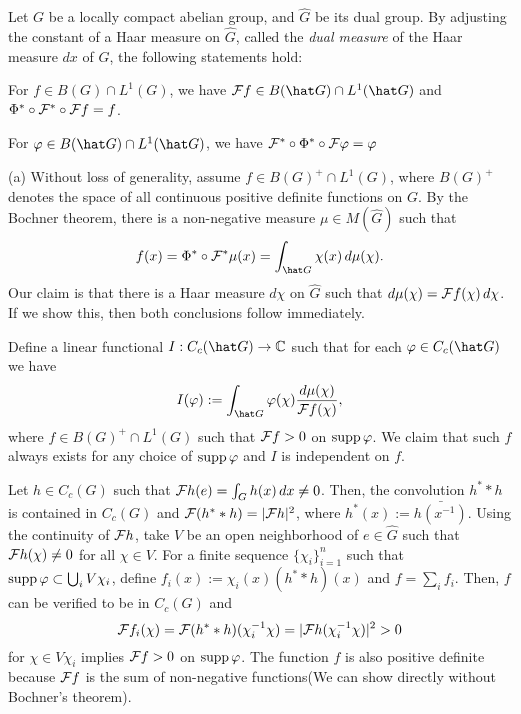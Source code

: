 \documentclass[a4paper]{article}
\begin{document}
\begin{thm}
Let $G$ be a locally compact abelian group, and $\hat G$ be its dual group.
By adjusting the constant of a Haar measure on $\hat G$, called the \emph{dual measure} of the Haar measure $dx$ of $G$, the following statements hold:
\begin{parts}
\item For $f\in B(G)\cap L^1(G)$, we have $\cF f\in B(\hat G)\cap L^1(\hat G)$ and $\Phi^*\circ\mathcal{F}^*\circ\mathcal{F} f=f$.
\item For $\f\in B(\hat G)\cap L^1(\hat G)$, we have $\mathcal{F}^*\circ\Phi^*\circ\mathcal{F}\varphi=\varphi$
\end{parts}
\end{thm}
\begin{pf}
(a)
Without loss of generality, assume $f\in B(G)^+\cap L^1(G)$, where $B(G)^+$ denotes the space of all continuous positive definite functions on $G$.
By the Bochner theorem, there is a non-negative measure $\mu\in M(\hat G)$ such that
\[f(x)=\Phi^*\circ\cF^*\mu(x)=\int_{\hat G}\chi(x)\,d\mu(\chi).\]
Our claim is that there is a Haar measure $d\chi$ on $\hat G$ such that $d\mu(\chi)=\mathcal{F} f(\chi)\,d\chi$.
If we show this, then both conclusions follow immediately.

Define a linear functional $I:C_c(\hat G)\to\C$ such that for each $\f\in C_c(\hat G)$ we have
\[I(\f):=\int_{\hat G}\f(\chi)\frac{d\mu(\chi)}{\cF f(\chi)},\]
where $f\in B(G)^+\cap L^1(G)$ such that $\mathcal{F} f>0$ on $\operatorname{supp}\varphi$.
We claim that such $f$ always exists for any choice of $\operatorname{supp}\varphi$ and $I$ is independent on $f$.

Let $h\in C_c(G)$ such that $\mathcal{F} h(e)=\int_Gh(x)\,dx\ne0$.
Then, the convolution $h^**h$ is contained in $C_c(G)$ and $\mathcal{F}(h^**h)=|\mathcal{F} h|^2$, where $h^*(x):=\bar{h(x^{-1})}$.
Using the continuity of $\mathcal{F} h$, take $V$ be an open neighborhood of $e\in\hat G$ such that $\mathcal{F} h(\chi)\ne0$ for all $\chi\in V$.
For a finite sequence $\{\chi_i\}_{i=1}^n$ such that $\operatorname{supp}\varphi\subset\bigcup_iV\chi_i$, define $f_i(x):=\chi_i(x)(h^**h)(x)$ and $f=\sum_if_i$.
Then, $f$ can be verified to be in $C_c(G)$ and
\[\mathcal{F} f_i(\chi)=\mathcal{F}(h^**h)(\chi_i^{-1}\chi)=|\mathcal{F} h(\chi_i^{-1}\chi)|^2>0\]
for $\chi\in V\chi_i$ implies $\mathcal{F} f>0$ on $\operatorname{supp}\varphi$.
The function $f$ is also positive definite because $\mathcal{F} f$ is the sum of non-negative functions(We can show directly without Bochner's theorem).


\end{pf}
\end{document}
